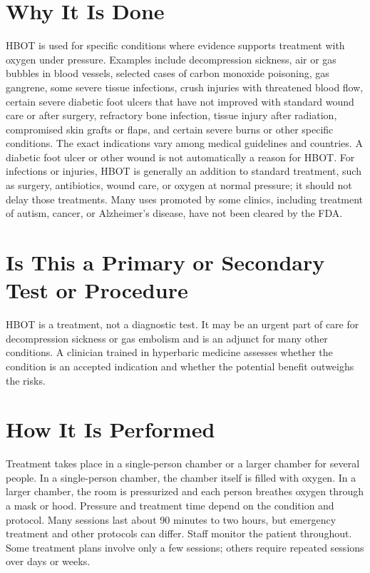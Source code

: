 \section*{Why It Is Done}
HBOT is used for specific conditions where evidence supports treatment with oxygen under pressure. Examples include decompression sickness, air or gas bubbles in blood vessels, selected cases of carbon monoxide poisoning, gas gangrene, some severe tissue infections, crush injuries with threatened blood flow, certain severe diabetic foot ulcers that have not improved with standard wound care or after surgery, refractory bone infection, tissue injury after radiation, compromised skin grafts or flaps, and certain severe burns or other specific conditions. The exact indications vary among medical guidelines and countries. A diabetic foot ulcer or other wound is not automatically a reason for HBOT. For infections or injuries, HBOT is generally an addition to standard treatment, such as surgery, antibiotics, wound care, or oxygen at normal pressure; it should not delay those treatments. Many uses promoted by some clinics, including treatment of autism, cancer, or Alzheimer's disease, have not been cleared by the FDA.

\section*{Is This a Primary or Secondary Test or Procedure}
HBOT is a treatment, not a diagnostic test. It may be an urgent part of care for decompression sickness or gas embolism and is an adjunct for many other conditions. A clinician trained in hyperbaric medicine assesses whether the condition is an accepted indication and whether the potential benefit outweighs the risks.

\section*{How It Is Performed}
Treatment takes place in a single-person chamber or a larger chamber for several people. In a single-person chamber, the chamber itself is filled with oxygen. In a larger chamber, the room is pressurized and each person breathes oxygen through a mask or hood. Pressure and treatment time depend on the condition and protocol. Many sessions last about 90 minutes to two hours, but emergency treatment and other protocols can differ. Staff monitor the patient throughout. Some treatment plans involve only a few sessions; others require repeated sessions over days or weeks.

